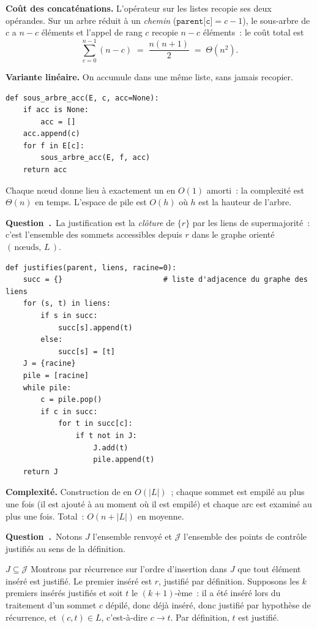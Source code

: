\documentclass[11pt,a4paper]{article}
\renewcommand{\Q}{\medskip\par\stepcounter{qcnt}\noindent\textbf{\color{cnc}Question~\theqcnt.}~}
\begin{document}
\textbf{Coût des concaténations.} L'opérateur \code{+} sur les listes recopie ses deux
opérandes. Sur un arbre réduit à un \emph{chemin} ($\texttt{parent[c]}=c-1$), le sous-arbre
de $c$ a $n-c$ éléments et l'appel de rang $c$ recopie $n-c$ éléments~: le coût total est
\[ \sum_{c=0}^{n-1}(n-c) \;=\; \frac{n(n+1)}{2} \;=\; \Theta(n^2). \]

\textbf{Variante linéaire.} On accumule dans une même liste, sans jamais recopier.
\begin{lstlisting}
def sous_arbre_acc(E, c, acc=None):
    if acc is None:
        acc = []
    acc.append(c)
    for f in E[c]:
        sous_arbre_acc(E, f, acc)
    return acc
\end{lstlisting}
Chaque n\oe ud donne lieu à exactement un  en $O(1)$ amorti~: la complexité est
$\Theta(n)$ en temps. L'espace de pile est $O(h)$ où $h$ est la hauteur de l'arbre.

\Q La justification est la \emph{clôture} de $\{r\}$ par les liens de supermajorité~: c'est
l'ensemble des sommets accessibles depuis $r$ dans le graphe orienté $(\,\text{n\oe uds},\,L\,)$.
\begin{lstlisting}
def justifies(parent, liens, racine=0):
    succ = {}                       # liste d'adjacence du graphe des liens
    for (s, t) in liens:
        if s in succ:
            succ[s].append(t)
        else:
            succ[s] = [t]
    J = {racine}
    pile = [racine]
    while pile:
        c = pile.pop()
        if c in succ:
            for t in succ[c]:
                if t not in J:
                    J.add(t)
                    pile.append(t)
    return J
\end{lstlisting}
\textbf{Complexité.} Construction de  en $O(|L|)$~; chaque sommet est empilé au
plus une fois (il est ajouté à  au moment où il est empilé) et chaque arc est examiné
au plus une fois. Total~: $O(n+|L|)$ en moyenne.

\Q Notons $J$ l'ensemble renvoyé et $\mathcal{J}$ l'ensemble des points de contrôle
justifiés au sens de la définition.

$\boxed{J\subseteq\mathcal{J}}$ Montrons par récurrence sur l'ordre d'insertion dans $J$ que
tout élément inséré est justifié. Le premier inséré est $r$, justifié par définition.
Supposons les $k$ premiers insérés justifiés et soit $t$ le $(k+1)$-ème~: il a été inséré
lors du traitement d'un sommet $c$ dépilé, donc déjà inséré, donc justifié par hypothèse de
récurrence, et $(c,t)\in L$, c'est-à-dire $c\to t$. Par définition, $t$ est justifié.
\end{document}
